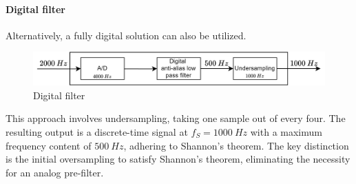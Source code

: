 \paragraph*{Digital filter}
Alternatively, a fully digital solution can also be utilized.
\begin{figure}[H]
    \centering
    \includegraphics[width=0.9\linewidth]{images/alias1.png}
    \caption{Digital filter}
\end{figure}
This approach involves undersampling, taking one sample out of every four. 
The resulting output is a discrete-time signal at $f_S=1000\:Hz$ with a maximum frequency content of $500\:Hz$, adhering to Shannon's theorem.
The key distinction is the initial oversampling to satisfy Shannon's theorem, eliminating the necessity for an analog pre-filter.